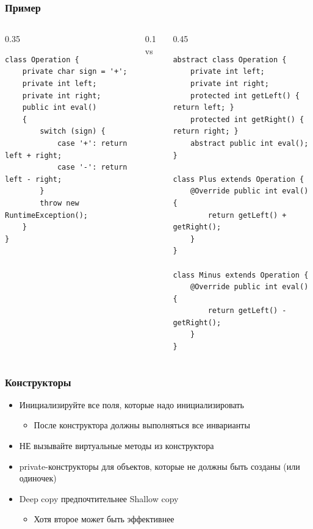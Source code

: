 \documentclass{../../slides-style}
\begin{document}
    \begin{frame}[fragile]
        \frametitle{Пример}
        \begin{footnotesize}
            \begin{columns}
                \begin{column}{0.35\textwidth}
                    \begin{verbatim}
class Operation {
    private char sign = '+';
    private int left;
    private int right;
    public int eval()
    {
        switch (sign) {
            case '+': return left + right;
            case '-': return left - right;
        }
        throw new RuntimeException();
    }
}
                    \end{verbatim}
                \end{column}
                \begin{column}{0.1\textwidth}
                    vs
                \end{column}
                \begin{column}{0.45\textwidth}
                    \begin{verbatim}
abstract class Operation {
    private int left;
    private int right;
    protected int getLeft() { return left; }
    protected int getRight() { return right; }
    abstract public int eval();
}

class Plus extends Operation {
    @Override public int eval() { 
        return getLeft() + getRight(); 
    }
}

class Minus extends Operation {
    @Override public int eval() { 
        return getLeft() - getRight(); 
    }
}
                    \end{verbatim}
                \end{column}
            \end{columns}
        \end{footnotesize}
    \end{frame}

    \begin{frame}
        \frametitle{Конструкторы}
        \begin{itemize}
            \item Инициализируйте все поля, которые надо инициализировать
            \begin{itemize}
                \item После конструктора должны выполняться все инварианты
            \end{itemize}
            \item НЕ вызывайте виртуальные методы из конструктора
            \item private-конструкторы для объектов, которые не должны быть созданы (или одиночек)
            \item Deep copy предпочтительнее Shallow copy
            \begin{itemize}
                \item Хотя второе может быть эффективнее
            \end{itemize}
        \end{itemize}
    \end{frame}
\end{document}
